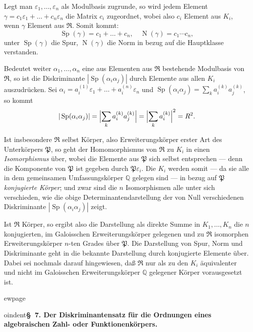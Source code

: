 \documentclass[12pt,a4paper]{article}
\newcommand{\mf}[1]{\mathfrak{#1}}     %
\newcommand{\PP}{\mathfrak{P}}          %
\newcommand{\QQ}{\mathbb{Q}}            %
\DeclareMathOperator{\Sp}{Sp}           %
\DeclareMathOperator{\Nm}{N}            %
\theoremstyle{definition}
\begin{document}
Legt man $\varepsilon_1,\dots,\varepsilon_n$ als Modulbasis zugrunde, so
wird jedem Element $\gamma = c_1\varepsilon_1 + \dots + c_n\varepsilon_n$
die Matrix $c_i$ zugeordnet, wobei also $c_i$ Element aus $K_i$, wenn
$\gamma$ Element aus $\mf{R}$. Somit kommt:
\[
\Sp(\gamma) = c_1 + \dots + c_n, \quad \Nm(\gamma) = c_1 \cdots c_n,
\]
unter $\Sp(\gamma)$ die Spur, $\Nm(\gamma)$ die Norm in bezug auf die
Hauptklasse verstanden.

Bedeutet weiter $\alpha_1,\dots,\alpha_n$ eine aus Elementen aus $\mf{R}$
bestehende Modulbasis von $\mf{R}$, so ist die Diskriminante
$|\Sp(\alpha_i\alpha_j)|$ durch Elemente aus allen $K_i$ auszudr\"ucken. Sei
$\alpha_i = a_i^{(1)}\varepsilon_1 + \dots + a_i^{(n)}\varepsilon_n$ und
$\Sp(\alpha_i\alpha_j) = \sum_k a_i^{(k)}a_j^{(k)}$, so kommt
\[
|\Sp(\alpha_i\alpha_j)| = \Bigl|\sum_k a_i^{(k)}a_j^{(k)}\Bigr|
= \Bigl|\sum_k a_i^{(k)}\Bigr|^2 = R^2.
\]

Ist insbesondere $\mf{R}$ selbst K\"orper, also Erweiterungsk\"orper erster
Art des Unterk\"orpers $\PP$, so geht der Homomorphismus von $\mf{R}$ zu
$K_i$ in einen \textit{Isomorphismus} \"uber, wobei die Elemente aus $\PP$
sich selbst entsprechen --- denn die Komponente von $\PP$ ist gegeben
durch $\PP\varepsilon_i$. Die $K_i$ werden somit --- da sie alle in dem
gemeinsamen Umfassungsk\"orper $\QQ$ gelegen sind --- in bezug auf $\PP$
\textit{konjugierte K\"orper}; und zwar sind die $n$ Isomorphismen alle unter
sich verschieden, wie die obige Determinantendarstellung der von Null
verschiedenen Diskriminante $|\Sp(\alpha_i\alpha_j)|$ zeigt.

Ist $\mf{R}$ K\"orper, so ergibt also die Darstellung als direkte Summe in
$K_1,\dots,K_n$ die $n$ konjugierten, im Galoisschen Erweiterungsk\"orper
gelegenen und zu $\mf{R}$ isomorphen Erweiterungsk\"orper $n$-ten Grades
\"uber $\PP$. Die Darstellung von Spur, Norm und Diskriminante geht in die
bekannte Darstellung durch konjugierte Elemente \"uber. Dabei sei nochmals
darauf hingewiesen, da\ss{} $\mf{R}$ nur als zu den $K_i$ \"aquivalenter und
nicht im Galoisschen Erweiterungsk\"orper $\QQ$ gelegener K\"orper
vorausgesetzt ist.



ewpage
\setcounter{page}{560}



oindent\textbf{\S~7. Der Diskriminantensatz f\"ur die Ordnungen eines
algebraischen Zahl- oder Funktionenk\"orpers.}

\medskip
\end{document}
